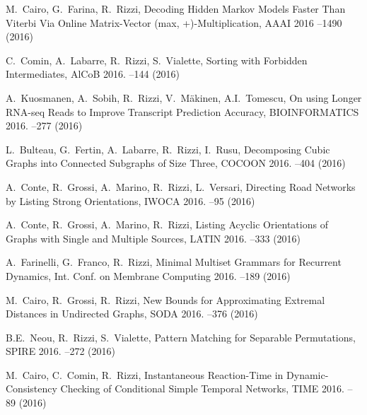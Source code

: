 \begin{etaremune}
  \item {\sc M.~Cairo, G.~Farina, R.~Rizzi},
   \newblock Decoding Hidden Markov Models Faster Than Viterbi Via Online Matrix-Vector (max, +)-Multiplication,
   \newblock AAAI 2016
   --1490 (2016)

  \item {\sc C.~Comin, A.~Labarre, R.~Rizzi, S.~Vialette},
   \newblock Sorting with Forbidden Intermediates,
   \newblock AlCoB 2016.
   --144 (2016)

  \item {\sc A.~Kuosmanen, A.~Sobih, R.~Rizzi, V.~Mäkinen, A.I.~Tomescu},
   \newblock On using Longer RNA-seq Reads to Improve Transcript Prediction Accuracy,
   \newblock BIOINFORMATICS 2016.
   --277 (2016)

  \item {\sc L.~Bulteau, G.~Fertin, A.~Labarre, R.~Rizzi, I.~Rusu},
   \newblock Decomposing Cubic Graphs into Connected Subgraphs of Size Three,
   \newblock COCOON 2016.
   --404 (2016)

  \item {\sc A.~Conte, R.~Grossi, A.~Marino, R.~Rizzi, L.~Versari},
   \newblock Directing Road Networks by Listing Strong Orientations,
   \newblock IWOCA 2016.
   --95 (2016)

  \item {\sc A.~Conte, R.~Grossi, A.~Marino, R.~Rizzi},
   \newblock Listing Acyclic Orientations of Graphs with Single and Multiple Sources,
   \newblock LATIN 2016.
   --333 (2016)

  \item {\sc A.~Farinelli, G.~Franco, R.~Rizzi},
   \newblock Minimal Multiset Grammars for Recurrent Dynamics,
   \newblock Int. Conf. on Membrane Computing 2016.
   --189 (2016)

  \item {\sc M.~Cairo, R.~Grossi, R.~Rizzi},
   \newblock New Bounds for Approximating Extremal Distances in Undirected Graphs,
   \newblock SODA 2016.
   --376 (2016)

  \item {\sc B.E.~Neou, R.~Rizzi, S.~Vialette},
   \newblock Pattern Matching for Separable Permutations,
   \newblock SPIRE 2016.
   --272 (2016)

  \item {\sc M.~Cairo, C.~Comin, R.~Rizzi},
   \newblock Instantaneous Reaction-Time in Dynamic-Consistency Checking of Conditional Simple Temporal Networks,
   \newblock TIME 2016.
   --89 (2016)


\end{etaremune}
